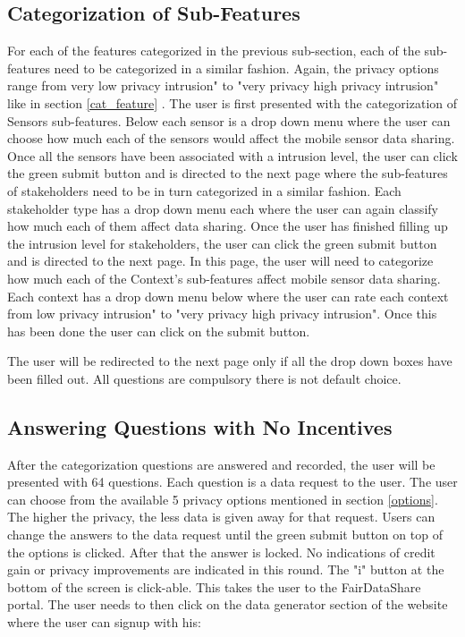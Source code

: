 \subsection{Categorization of Sub-Features}
For each of the features categorized in the previous sub-section, each of the sub-features need to be categorized in a similar fashion. Again,
the privacy options range from very low privacy intrusion" to "very privacy high privacy intrusion" like in section \ref{cat_feature} . The user is first presented with
the categorization of Sensors sub-features. Below each sensor is a drop down menu where the user can choose how much each of the sensors
would affect the mobile sensor data sharing. Once all the sensors have been associated with a intrusion level, the user can click the green submit button and is directed to
the next page where the sub-features of stakeholders need to be in turn categorized in a similar fashion. Each stakeholder type has a drop
down menu each where the user can again classify how much each of them affect data sharing.
Once the user has finished filling up the intrusion level for stakeholders, the user can click the green submit button and is directed to the next page.
In this page, the user will need to categorize how much each of the Context's sub-features affect mobile sensor data sharing. Each context has a drop down menu below where the user can rate each context from low privacy intrusion" to "very privacy high privacy intrusion". Once this has been done the user can click on the submit button.

The user will be redirected to the next page only if all the drop down boxes have been filled out. All questions are compulsory there is not default choice.

\subsection{Answering Questions with No Incentives}  \label{quest_wi}
After the categorization questions are answered and recorded, the user will be presented with 64 questions. Each question is a data request
to the user. The user can choose from the available 5 privacy options mentioned in section \ref{options}. The higher the privacy, the less data is given away for that request. Users can change the answers to the data request until the green submit button on top of the options is clicked. After that the answer is locked. No indications of credit gain or privacy improvements are indicated in this round. The "i" button at the bottom of the screen is click-able. This takes the user to the FairDataShare portal. The user needs to then click on the data generator section of the website where the user can signup with his:

